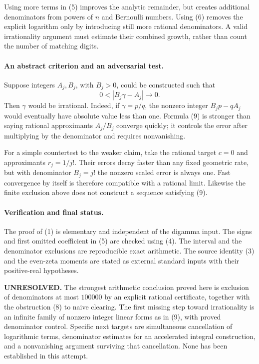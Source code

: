 \documentclass[11pt]{article}
\begin{document}
Using more terms in (5) improves the analytic remainder, but creates
additional denominators from powers of $n$ and Bernoulli numbers.
Using (6) removes the explicit logarithm only by introducing still more
rational denominators. A valid irrationality argument must estimate
their combined growth, rather than count the number of matching digits.

\paragraph{An abstract criterion and an adversarial test.}
Suppose integers $A_j,B_j$, with $B_j>0$, could be constructed such that
\[
                      0<|B_j\gamma-A_j|\longrightarrow0.\tag{9}
\]
Then $\gamma$ would be irrational. Indeed, if $\gamma=p/q$, the
nonzero integer $B_jp-qA_j$ would eventually have absolute value less
than one. Formula (9) is stronger than saying rational approximants
$A_j/B_j$ converge quickly; it controls the error after multiplying
by the denominator and requires nonvanishing.

For a simple countertest to the weaker claim, take the rational target
$c=0$ and approximants $r_j=1/j!$. Their errors decay faster than any
fixed geometric rate, but with denominator $B_j=j!$ the nonzero
scaled error is always one. Fast convergence by itself is therefore
compatible with a rational limit. Likewise the finite exclusion above
does not construct a sequence satisfying (9).

\paragraph{Verification and final status.}
The proof of (1) is elementary and independent of the digamma input.
The signs and first omitted coefficient in (5) are checked using (4).
The interval and the denominator exclusions are reproducible exact
arithmetic. The source identity (3) and the even-zeta moments are stated
as external standard inputs with their positive-real hypotheses.

\textbf{UNRESOLVED.} The strongest arithmetic conclusion proved here
is exclusion of denominators at most $100000$ by an explicit rational
certificate, together with the obstruction (8) to naive clearing.
The first missing step toward irrationality is an infinite family of
nonzero integer linear forms as in (9), with proved denominator control.
Specific next targets are simultaneous cancellation of logarithmic
terms, denominator estimates for an accelerated integral construction,
and a nonvanishing argument surviving that cancellation. None has been
established in this attempt.
\end{document}
